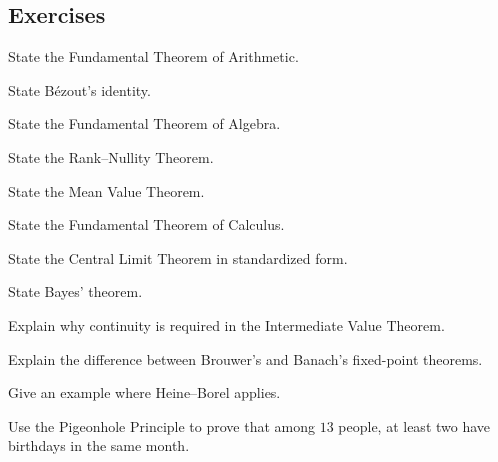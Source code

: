 \subsection{Exercises}
\label{subsec:common-mathematical-theorems-exercises}

\begin{exercise}[1]
State the Fundamental Theorem of Arithmetic.
\end{exercise}

\begin{exercise}[1]
State Bézout's identity.
\end{exercise}

\begin{exercise}[1]
State the Fundamental Theorem of Algebra.
\end{exercise}

\begin{exercise}[1]
State the Rank--Nullity Theorem.
\end{exercise}

\begin{exercise}[1]
State the Mean Value Theorem.
\end{exercise}

\begin{exercise}[1]
State the Fundamental Theorem of Calculus.
\end{exercise}

\begin{exercise}[1]
State the Central Limit Theorem in standardized form.
\end{exercise}

\begin{exercise}[1]
State Bayes' theorem.
\end{exercise}

\begin{exercise}[2]
Explain why continuity is required in the Intermediate Value Theorem.
\end{exercise}

\begin{exercise}[2]
Explain the difference between Brouwer's and Banach's fixed-point theorems.
\end{exercise}

\begin{exercise}[2]
Give an example where Heine--Borel applies.
\end{exercise}

\begin{exercise}[2]
Use the Pigeonhole Principle to prove that among \(13\) people, at least two
have birthdays in the same month.
\end{exercise}

